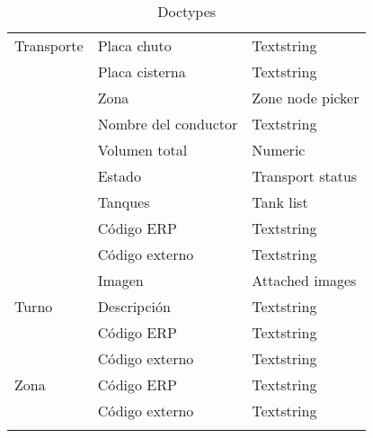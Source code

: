 \begin{longtable}{ | p{5em} | l | l | }
    Transporte
        & Placa chuto & Textstring \\
        \cline{2-3}
        & Placa cisterna & Textstring \\
        \cline{2-3}
        & Zona & Zone node picker \\
        \cline{2-3}
        & Nombre del conductor & Textstring \\
        \cline{2-3}
        & Volumen total & Numeric \\
        \cline{2-3}
        & Estado & Transport status \\
        \cline{2-3}
        & Tanques & Tank list \\
        \cline{2-3}
        & Código ERP & Textstring \\
        \cline{2-3}
        & Código externo & Textstring \\
        \cline{2-3}
        & Imagen & Attached images \\
    \hline

    Turno
        & Descripción & Textstring \\
        \cline{2-3}
        & Código ERP & Textstring \\
        \cline{2-3}
        & Código externo & Textstring \\
    \hline

    Zona
        & Código ERP & Textstring \\
        \cline{2-3}
        & Código externo & Textstring \\
    \hline

    \caption{Doctypes}
    \label{table:doctypes}
\end{longtable}

